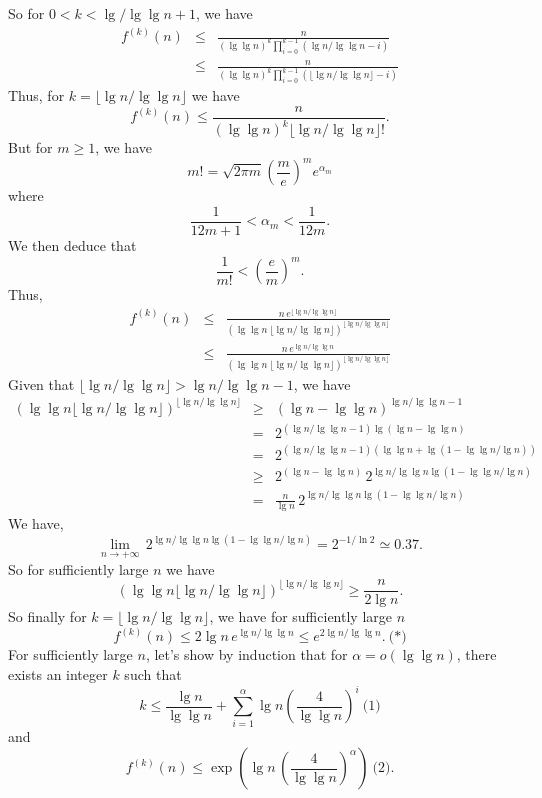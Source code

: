 \documentclass[a4paper,12pt]{article}
\begin{document}
So for $0 < k < \lg / \lg \lg n + 1$, we have
\begin{eqnarray*}
f^{(k)}(n) &\le&\frac{n}
{(\lg \lg n)^k \prod_{i=0}^{k-1}(\lg n/\lg \lg n - i)} \\
&\le& \frac{n}
{(\lg\lg n)^k \prod_{i=0}^{k-1}(\lfloor \lg n/\lg\lg n\rfloor - i)}
\end{eqnarray*}
Thus, for $k = \lfloor \lg n/\lg\lg n\rfloor$ we have
\[ f^{(k)}(n) \le \frac{n}{(\lg\lg n)^k\lfloor \lg n/\lg\lg
  n\rfloor!}.\]
But for $m \ge 1$, we have
\[ m! = \sqrt{2\pi m}\left(\frac{m}{e}\right)^m e^{\alpha_m}\]
where
\[ \frac{1}{12m+1} < \alpha_m < \frac{1}{12m}.\]
We then deduce that
\[ \frac{1}{m!} < \left(\frac{e}{m}\right)^m.\]
Thus,
\begin{eqnarray*}
f^{(k)}(n) &\le& \frac{n\,e^{\lfloor \lg n/\lg\lg n\rfloor}}{
(\lg\lg n\ \lfloor \lg n/\lg\lg n\rfloor)^{\lfloor \lg n/\lg\lg
    n\rfloor}} \\ &\le&
\frac{n\,e^{\lg n/\lg\lg n}}{(\lg\lg n\ \lfloor \lg n/\lg\lg n\rfloor)^{\lfloor \lg n/\lg\lg
    n\rfloor}}
\end{eqnarray*}
Given that $\lfloor \lg n/\lg\lg n\rfloor > \lg n/\lg\lg n - 1$,
we have
\begin{eqnarray*}
(\lg\lg n \lfloor \lg n/\lg\lg n\rfloor)^{\lfloor \lg n/\lg \lg
    n\rfloor}
&\ge& (\lg n - \lg\lg n)^{\lg n/\lg\lg n - 1} \\
&=& 2^{(\lg n / \lg\lg n - 1)\lg(\lg n - \lg \lg n)} \\
&=& 2^{(\lg n/\lg\lg n - 1)(\lg \lg n + \lg(1 - \lg \lg n/\lg n))} \\
&\ge& 2^{(\lg n - \lg\lg n)}\,2^{\lg n/\lg\lg n \lg(1-\lg\lg n/\lg n)} \\
&=& \frac{n}{\lg n}\,2^{\lg n/\lg\lg n \lg(1-\lg\lg n/\lg n)}
\end{eqnarray*}
We have,
\[ \lim_{n \to +\infty}\,2^{\lg n/\lg\lg n \lg(1-\lg\lg n/\lg n)}
= 2^{-1/\ln 2} \simeq 0.37.\]
So for sufficiently large $n$ we have
\[ (\lg\lg n \lfloor \lg n/\lg\lg n\rfloor)^{\lfloor \lg n/\lg \lg
    n\rfloor}
\ge \frac{n}{2\lg n}.\]
So finally for $k = \lfloor\lg n/\lg\lg n\rfloor$, we have for
sufficiently large $n$
\[ f^{(k)}(n) \le 2\lg n\,e^{\lg n/\lg\lg n} \le
e^{2\lg n/\lg\lg n}.\ \mbox{(*)}\]
For sufficiently large $n$, let's show by induction that for $\alpha
= o(\lg\lg n)$, there exists an integer $k$ such that
\[ k \le \frac{\lg n}{\lg\lg n} +
\sum_{i=1}^\alpha \lg n\left(\frac{4}{\lg\lg n}\right)^i
\ \mbox{(1)}\]
and
\[ f^{(k)}(n) \le \exp\left(\lg n\,
\left(\frac{4}{\lg\lg n}\right)^\alpha\right)\ \mbox{(2)}.\]
\end{document}
